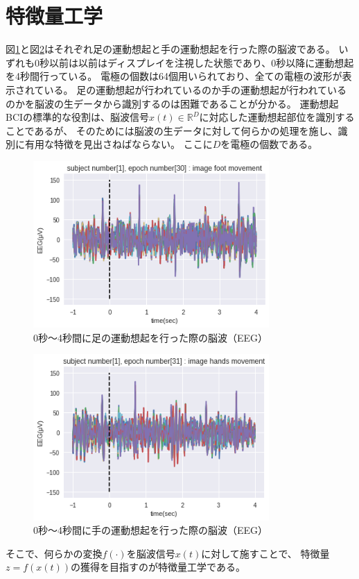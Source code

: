 
\section{特徴量工学}
図\ref{fig:EEGfootmove}と図\ref{fig:EEGhandmove}はそれぞれ足の運動想起と手の運動想起を行った際の脳波である。
いずれも0秒以前は以前はディスプレイを注視した状態であり、0秒以降に運動想起を4秒間行っている。
電極の個数は64個用いられており、全ての電極の波形が表示されている。
足の運動想起が行われているのか手の運動想起が行われているのかを脳波の生データから識別するのは困難であることが分かる。
運動想起BCIの標準的な役割は、脳波信号\(x(t)\in \mathbb R^D\)に対応した運動想起部位を識別することであるが、
そのためには脳波の生データに対して何らかの処理を施し、識別に有用な特徴を見出さねばならない。
ここに\(D\)を電極の個数である。
\begin{figure}[t]
    \centering
    \includegraphics[width=9cm]{images/EEGfootmove.png}
    \caption{0秒〜4秒間に足の運動想起を行った際の脳波（EEG）}
    \label{fig:EEGfootmove}
\end{figure}
\begin{figure}[t]
    \centering
    \includegraphics[width=9cm]{images/EEGhandmove.png}
    \caption{0秒〜4秒間に手の運動想起を行った際の脳波（EEG）}
    \label{fig:EEGhandmove}
\end{figure}
そこで、何らかの変換\(f(\cdot)\)を脳波信号\(x(t)\)に対して施すことで、
特徴量\(z=f(x(t))\)の獲得を目指すのが特徴量工学である。


